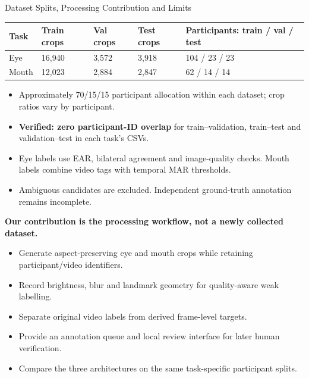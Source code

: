 \documentclass[aspectratio=169,10pt]{beamer}
\renewcommand{\arraystretch}{1.22}
\begin{document}
\begin{frame}[t]{Dataset Splits, Processing Contribution and Limits}
\fontsize{10}{11.5}\selectfont
\renewcommand{\arraystretch}{1.06}
\setlength{\tabcolsep}{4pt}
\setlength{\abovedisplayskip}{4pt}
\setlength{\belowdisplayskip}{4pt}
\begin{tabularx}{\textwidth}{L{2cm} L{2cm} L{2cm} L{2cm} Y}
\toprule
\textbf{Task} & \textbf{Train crops} & \textbf{Val crops} & \textbf{Test crops} & \textbf{Participants: train / val / test}\\\midrule
Eye & 16,940 & 3,572 & 3,918 & 104 / 23 / 23\\
Mouth & 12,023 & 2,884 & 2,847 & 62 / 14 / 14\\\bottomrule
\end{tabularx}
\par\vspace{1pt}
\begin{itemize}\setlength\itemsep{0pt}
\item Approximately 70/15/15 participant allocation within each dataset; crop ratios vary by participant.
\item \textbf{Verified: zero participant-ID overlap} for train--validation, train--test and validation--test in each task's CSVs.
\item Eye labels use EAR, bilateral agreement and image-quality checks. Mouth labels combine video tags with temporal MAR thresholds.
\item Ambiguous candidates are excluded. Independent ground-truth annotation remains incomplete.
\end{itemize}
\par\medskip
\textbf{Our contribution is the processing workflow, not a newly collected dataset.}
\par\vspace{1pt}
\begin{itemize}\setlength\itemsep{0pt}
\item Generate aspect-preserving eye and mouth crops while retaining participant/video identifiers.
\item Record brightness, blur and landmark geometry for quality-aware weak labelling.
\item Separate original video labels from derived frame-level targets.
\item Provide an annotation queue and local review interface for later human verification.
\item Compare the three architectures on the same task-specific participant splits.

\end{itemize}
\end{frame}
\end{document}
